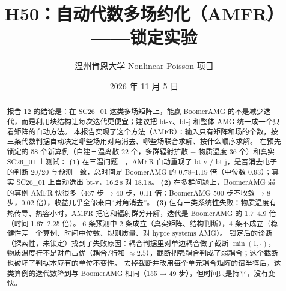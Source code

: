 \documentclass[11pt,a4paper]{ctexart}
\title{H50：自动代数多场约化（AMFR）——锁定实验}
\author{温州肯恩大学 \quad Nonlinear Poisson 项目}
\date{2026 年 11 月 5 日}
\begin{document}
\maketitle

\begin{abstract}
报告 12 的结论是：在 SC26\_01 这类多场矩阵上，能赢 BoomerAMG 的不是减少迭代，而是利用块结构让每次迭代更便宜；建议把 bt-v、bt-j 和整体 AMG 统一成一个只看矩阵的自动方法。
本报告实现了这个方法（AMFR）：输入只有矩阵和场的个数，按三条代数判据自动决定哪些场用对角消去、哪些场联合求解、按什么顺序求解。
在预先锁定的 58 个新算例（自建三温离散 22 个，多群辐射扩散 + 物质温度 36 个）和真实 SC26\_01 上测试：
\textbf{(1)} 在三温问题上，AMFR 自动重现了 bt-v / bt-j，是否消去电子的判断 20/20 与预测一致，总时间是 BoomerAMG 的 0.78--1.19 倍（中位数 0.93）；真实 SC26\_01 上自动选出 bt-v，16.2\,s 对 18.1\,s。
\textbf{(2)} 在多群问题上，BoomerAMG 弱的算例 AMFR 快很多（467 步 → 40 步，0.11 倍；BoomerAMG 500 步不收敛 → 8 步，0.02 倍），收益几乎全部来自“对角消去”。
\textbf{(3)} 但有一类系统性失败：物质温度有热传导、热容小时，AMFR 把它和辐射群分开解，迭代是 BoomerAMG 的 1.7--4.9 倍（时间 1.67--2.25 倍）。
6 条预测中 2 条成立（真实矩阵、结构判断），4 条不成立（稳健性差一个算例、时间中位数、规则质量、对 hypre systems AMG）。
锁定后的诊断（探索性，未锁定）找到了失败原因：耦合判据里对单边耦合做了截断 $\min(1,\cdot)$，物质温度行不是对角占优（耦合/行和 $\approx 2.5$），截断把强耦合判成了弱耦合；这个截断也破坏了判据本应有的单位不变性。
去掉截断并改用每个单元耦合矩阵的谱半径后，这类算例的迭代数降到与 BoomerAMG 相同（155 → 49 步），但时间只是持平，没有变快。
\end{abstract}
\end{document}
